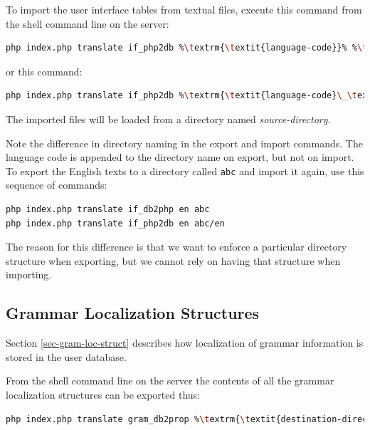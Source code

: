 \documentclass[11pt,oneside,a4paper]{memoir}
\begin{document}
To import the user interface tables from textual files, execute this command from the shell command
line on the server:

\begin{lstlisting}[language=bash,basicstyle={\ttfamily}]
php index.php translate if_php2db %\textrm{\textit{language-code}}% %\textrm{\textit{source-directory}}%
\end{lstlisting}


\noindent
or this command:

\begin{lstlisting}[language=bash,basicstyle={\ttfamily}]
php index.php translate if_php2db %\textrm{\textit{language-code}\_\textit{variant}}% %\textrm{\textit{source-directory}}%
\end{lstlisting}

The imported files will be loaded from a directory named \emph{source-directory}.

Note the difference in directory naming in the export and import commands. The language code is
appended to the directory name on export, but not on import. To export the English
texts to a directory called \texttt{abc} and import it again, use this sequence of commands:

\begin{lstlisting}[language=bash,basicstyle={\ttfamily}]
php index.php translate if_db2php en abc
php index.php translate if_php2db en abc/en
\end{lstlisting}

The reason for this difference is that we want to enforce a particular directory structure when
exporting, but we cannot rely on having that structure when importing.

\subsection{Grammar Localization Structures}

Section \ref{sec-gram-loc-struct} describes how localization of grammar information is stored in the
user database.

From the shell command line on the server the contents of all the grammar localization structures can be exported
thus:

\begin{lstlisting}[language=bash,basicstyle={\ttfamily}]
php index.php translate gram_db2prop %\textrm{\textit{destination-directory}}%
\end{lstlisting}
\end{document}
